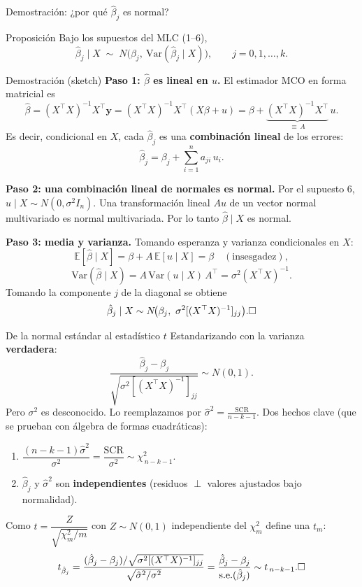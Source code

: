 \documentclass{beamer}
\begin{document}
\begin{frame}[allowframebreaks]{Demostración: ¿por qué $\hat{\beta}_j$ es normal?}

\begin{alertblock}{Proposición}
Bajo los supuestos del MLC (1--6),
\[
\hat{\beta}_j \mid X \;\sim\; N\!\big(\beta_j,\ \text{Var}(\hat{\beta}_j\mid X)\big),
\qquad j = 0,1,\ldots,k.
\]
\end{alertblock}

\begin{exampleblock}{Demostración (sketch)}
\textbf{Paso 1: $\hat{\beta}$ es lineal en $u$.} El estimador MCO en forma matricial es
\[
\hat{\beta} = (X^{\top}X)^{-1}X^{\top}\mathbf{y}
           = (X^{\top}X)^{-1}X^{\top}(X\beta + u)
           = \beta + \underbrace{(X^{\top}X)^{-1}X^{\top}}_{\equiv\, A}\, u .
\]
Es decir, condicional en $X$, cada $\hat{\beta}_j$ es una \textbf{combinación lineal} de los errores:
\[
\hat{\beta}_j = \beta_j + \sum_{i=1}^{n} a_{ji}\, u_i .
\]

\textbf{Paso 2: una combinación lineal de normales es normal.} Por el supuesto 6, $u\mid X \sim N(0,\sigma^2 I_n)$. Una transformación lineal $A u$ de un vector normal multivariado es normal multivariada. Por lo tanto $\hat{\beta}\mid X$ es normal.

\framebreak

\textbf{Paso 3: media y varianza.} Tomando esperanza y varianza condicionales en $X$:
\[
\mathbb{E}[\hat{\beta}\mid X] = \beta + A\,\mathbb{E}[u\mid X] = \beta
\quad (\text{insesgadez}),
\]
\[
\text{Var}(\hat{\beta}\mid X) = A\,\text{Var}(u\mid X)\,A^{\top}
= \sigma^2 (X^{\top}X)^{-1}.
\]
Tomando la componente $j$ de la diagonal se obtiene
\[
\hat{\beta}_j\mid X \sim N\!\big(\beta_j,\ \sigma^2 [(X^{\top}X)^{-1}]_{jj}\big).
\hfill \square
\]
\end{exampleblock}

\framebreak

\begin{exampleblock}{De la normal estándar al estadístico $t$}
Estandarizando con la varianza \textbf{verdadera}:
\[
\frac{\hat{\beta}_j - \beta_j}{\sqrt{\sigma^2 [(X^{\top}X)^{-1}]_{jj}}} \sim N(0,1).
\]
Pero $\sigma^2$ es desconocido. Lo reemplazamos por $\hat{\sigma}^2 = \tfrac{\text{SCR}}{n-k-1}$. Dos hechos clave (que se prueban con álgebra de formas cuadráticas):
\begin{enumerate}
    \item $\dfrac{(n-k-1)\hat{\sigma}^2}{\sigma^2} = \dfrac{\text{SCR}}{\sigma^2} \sim \chi^2_{\,n-k-1}$.
    \item $\hat{\beta}_j$ y $\hat{\sigma}^2$ son \textbf{independientes} (residuos $\perp$ valores ajustados bajo normalidad).
\end{enumerate}
Como $t = \dfrac{Z}{\sqrt{\chi^2_{m}/m}}$ con $Z\sim N(0,1)$ independiente del $\chi^2_m$ define una $t_m$:
\[
t_{\hat{\beta}_j} = \frac{(\hat{\beta}_j-\beta_j)/\sqrt{\sigma^2[(X^{\top}X)^{-1}]_{jj}}}{\sqrt{\hat{\sigma}^2/\sigma^2}}
= \frac{\hat{\beta}_j - \beta_j}{\text{s.e.}(\hat{\beta}_j)} \sim t_{\,n-k-1}.
\hfill \square
\]
\end{exampleblock}

\end{frame}
\end{document}
